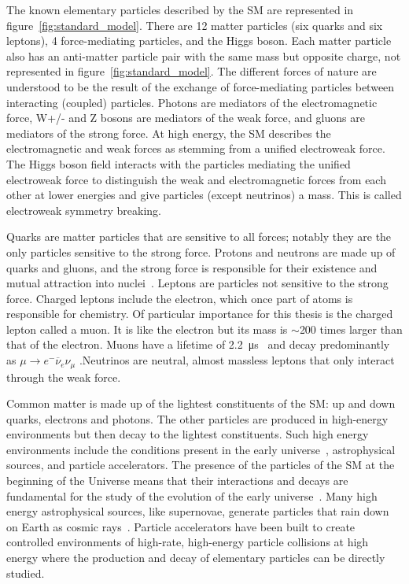 The known elementary particles described by the SM are represented in figure~\ref{fig:standard_model}.  There are 12 matter particles (six quarks and six leptons), 4 force-mediating particles, and the Higgs boson. Each matter particle also has an anti-matter particle pair with the same mass but opposite charge, not represented in figure~\ref{fig:standard_model}. The different forces of nature are understood to be the result of the exchange of force-mediating particles between interacting (coupled) particles. Photons are mediators of the electromagnetic force, W+/- and Z bosons are mediators of the weak force, and gluons are mediators of the strong force. At high energy, the SM describes the electromagnetic and weak forces as stemming from a unified electroweak force. The Higgs boson field interacts with the particles mediating the unified electroweak force to distinguish the weak and electromagnetic forces from each other at lower energies and give particles (except neutrinos) a mass. This is called electroweak symmetry breaking. 

Quarks are matter particles that are sensitive to all forces; notably they are the only particles sensitive to the strong force. Protons and neutrons are made up of quarks and gluons, and the strong force is responsible for their existence and mutual attraction into nuclei~\cite{bertulani_nuclear_2007}. Leptons are particles not sensitive to the strong force. Charged leptons include the electron, which once part of atoms is responsible for chemistry. Of particular importance for this thesis is the charged lepton called a muon. It is like the electron but its mass is $\sim$200 times larger than that of the electron. Muons have a lifetime of \SI{2.2}{\micro\second}~\cite{zyla_review_2020} and decay predominantly as $\mu \rightarrow e^{-}\overline{\nu}_{e}\nu_{\mu}$ .Neutrinos are neutral, almost massless leptons that only interact through the weak force. 

Common matter is made up of the lightest constituents of the SM: up and down quarks, electrons and photons. The other particles are produced in high-energy environments but then decay to the lightest constituents. Such high energy environments include the conditions present in the early universe~\cite{carroll_introduction_2007}, astrophysical sources, and particle accelerators. The presence of the particles of the SM at the beginning of the Universe means that their interactions and decays are fundamental for the study of the evolution of the early universe~\cite{carroll_introduction_2007}. Many high energy astrophysical sources, like supernovae, generate particles that rain down on Earth as cosmic rays~\cite{boezio_chemical_2012}. Particle accelerators have been built to create controlled environments of high-rate, high-energy particle collisions at high energy where the production and decay of elementary particles can be directly studied.

